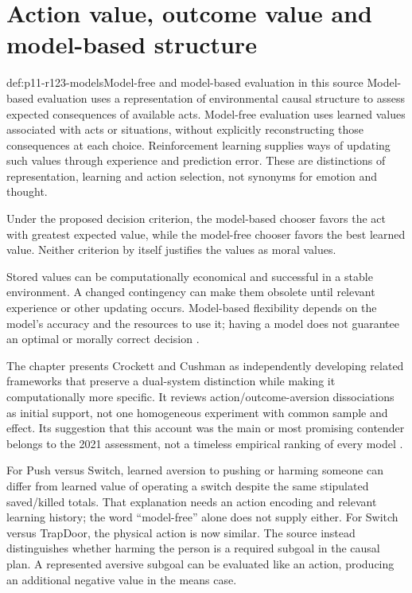 \section{Action value, outcome value and model-based structure}
\label{sec:p11-r123-models}

\begin{hbdefinition}{def:p11-r123-models}{Model-free and model-based evaluation in this source}
Model-based evaluation uses a representation of environmental causal
structure to assess expected consequences of available acts. Model-free
evaluation uses learned values associated with acts or situations, without
explicitly reconstructing those consequences at each choice. Reinforcement
learning supplies ways of updating such values through experience and
prediction error. These are distinctions of representation, learning and
action selection, not synonyms for emotion and thought.

Under the proposed decision criterion, the model-based chooser favors
the act with greatest expected value, while the model-free chooser favors
the best learned value. Neither criterion by itself justifies the values
as moral values.

Stored values can be computationally economical and successful in a
stable environment. A changed contingency can make them obsolete until
relevant experience or other updating occurs. Model-based flexibility
depends on the model's accuracy and the resources to use it; having a
model does not guarantee an optimal or morally correct decision
\parencite[p.~703]{WiegmannSauer2021MoralJudgment}.
\end{hbdefinition}

The chapter presents Crockett and Cushman as independently developing
related frameworks that preserve a dual-system distinction while making
it computationally more specific. It reviews action/outcome-aversion
dissociations as initial support, not one homogeneous experiment with
common sample and effect. Its suggestion that this account was the main
or most promising contender belongs to the 2021 assessment, not a
timeless empirical ranking of every model
\parencite[pp.~701,703--704]{WiegmannSauer2021MoralJudgment}.

For Push versus Switch, learned aversion to pushing or harming someone
can differ from learned value of operating a switch despite the same
stipulated saved/killed totals. That explanation needs an action encoding
and relevant learning history; the word ``model-free'' alone does not
supply either. For Switch versus TrapDoor, the physical action is now
similar. The source instead distinguishes whether harming the person
is a required subgoal in the causal plan. A represented aversive subgoal
can be evaluated like an action, producing an additional negative value
in the means case.

